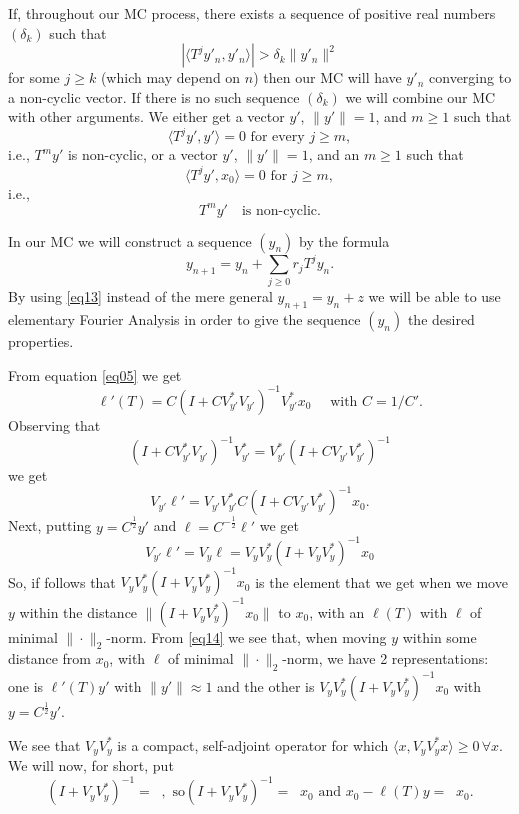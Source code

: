 \documentclass[12pt,oneside,reqno]{amsart}
\theoremstyle{definition}
\DeclareMathOperator*{\VV}{[\,\, ]^{-1}}
\begin{document}
If, throughout our MC process, there exists a sequence of positive real numbers $(\delta_k)$ such that 
$$\left| \langle T^j y'_n, y'_n \rangle \right| > \delta_k \|y'_n\|^2$$
for some $j \ge k $ (which may depend on $n$) then our MC will have $y'_n$ converging to a non-cyclic vector. If there is no such sequence $(\delta_k)$ we will combine our MC with other arguments. We either get a vector $y'$, $\|y'\| =1$, and $m \ge 1$ such that  
$$\langle T^j y', y' \rangle = 0 \text{ for every } j \ge m,$$
i.e., $T^my'$ is non-cyclic, or a vector $y'$, $\|y'\|=1$, and an $m \ge 1$ such that 
$$\langle T^jy', x_0 \rangle = 0 \text{ for } j \ge m,$$
i.e., 
\begin{equation}\label{eq12}
T^m y' \quad \text{is non-cyclic.}
\end{equation}

In our MC we will construct a sequence $(y_n)$ by the formula
\begin{equation}\label{eq13}
y_{n+1} = y_n + \sum_{j \ge 0} r_j T^j y_n.
\end{equation}
By using \eqref{eq13} instead of the mere general $y_{n+1} = y_n + z$ we will be able to use elementary Fourier Analysis in order to give the sequence $(y_n)$ the desired properties.

From equation \eqref{eq05} we get
$$\ell'(T) = C \left( I + C V_{y'}^{*} V_{y'}\right)^{-1} V_{y'}^{*} x_0 \quad \text{ with } C = 1/ C'.$$
Observing that 
$$\left( I + C V_{y'}^{*} V_{y'}\right)^{-1} V_{y'}^{*} = V_{y'}^{*} \left( I + C V_{y'} V_{y'}^{*} \right)^{-1} $$
we get
$$V_{y'}\ell' = V_{y'} V_{y'}^{*} C \left( I + C V_{y'} V_{y'}^{*}\right)^{-1} x_0.$$
Next, putting $y = C^{\frac{1}{2}} y'$ and $\ell = C^{-\frac{1}{2}} \ell'$ we get
\begin{equation}\label{eq14}
V_{y'}\ell' = V_y \ell = V_y V_y^{*}  \left( I + V_{y}V_{y}^{*} \right)^{-1} x_0
\end{equation}
So, if follows that $V_y V_y^{*}  \left( I + V_{y} V_{y}^{*} \right)^{-1} x_0$ is the element that we get when we move $y$ within the distance $\|(I + V_y V_y^{*})^{-1} x_0\|$ to $x_0$, with an $\ell(T)$ with $\ell$ of minimal $\|\cdot \|_2$-norm. From \eqref{eq14} we see that, when moving $y$ within some distance from $x_0$, with $\ell$ of minimal $\|\cdot \|_2$-norm, we have 2 representations: one is $\ell'(T) y'$ with $\|y'\| \approx 1$ and the other is $V_y V_y^{*}  \left( I + V_{y} V_{y}^{*}\right)^{-1} x_0$ with $y = C^{\frac{1}{2}} y'$.

We see that $V_{y} V_{y}^{*}$ is a compact, self-adjoint operator for which $\langle x, V_{y} V_{y}^{*} x \rangle \ge 0 \, \forall x.$  We will now, for short, put 
\begin{equation}\label{eq15}
\left(I+V_{y} V_{y}^{*}\right)^{-1} = \VV, \text{ so} \left(I+V_{y} V_{y}^{*}\right)^{-1}  = \VV x_0 \text{ and } x_0 - \ell(T)y = \VV x_0.
\end{equation}
\end{document}
